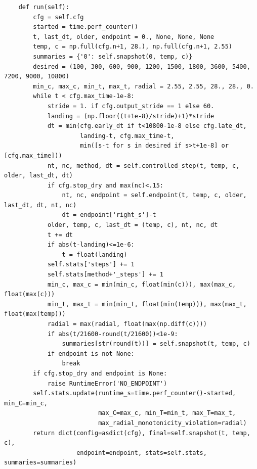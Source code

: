 \begin{verbatim}
    def run(self):
        cfg = self.cfg
        started = time.perf_counter()
        t, last_dt, older, endpoint = 0., None, None, None
        temp, c = np.full(cfg.n+1, 28.), np.full(cfg.n+1, 2.55)
        summaries = {'0': self.snapshot(0, temp, c)}
        desired = (100, 300, 600, 900, 1200, 1500, 1800, 3600, 5400, 7200, 9000, 10800)
        min_c, max_c, min_t, max_t, radial = 2.55, 2.55, 28., 28., 0.
        while t < cfg.max_time-1e-8:
            stride = 1. if cfg.output_stride == 1 else 60.
            landing = (np.floor((t+1e-8)/stride)+1)*stride
            dt = min(cfg.early_dt if t<10800-1e-8 else cfg.late_dt,
                     landing-t, cfg.max_time-t,
                     min([s-t for s in desired if s>t+1e-8] or [cfg.max_time]))
            nt, nc, method, dt = self.controlled_step(t, temp, c, older, last_dt, dt)
            if cfg.stop_dry and max(nc)<.15:
                nt, nc, endpoint = self.endpoint(t, temp, c, older, last_dt, dt, nt, nc)
                dt = endpoint['right_s']-t
            older, temp, c, last_dt = (temp, c), nt, nc, dt
            t += dt
            if abs(t-landing)<=1e-6:
                t = float(landing)
            self.stats['steps'] += 1
            self.stats[method+'_steps'] += 1
            min_c, max_c = min(min_c, float(min(c))), max(max_c, float(max(c)))
            min_t, max_t = min(min_t, float(min(temp))), max(max_t, float(max(temp)))
            radial = max(radial, float(max(np.diff(c))))
            if abs(t/21600-round(t/21600))<1e-9:
                summaries[str(round(t))] = self.snapshot(t, temp, c)
            if endpoint is not None:
                break
        if cfg.stop_dry and endpoint is None:
            raise RuntimeError('NO_ENDPOINT')
        self.stats.update(runtime_s=time.perf_counter()-started, min_C=min_c,
                          max_C=max_c, min_T=min_t, max_T=max_t,
                          max_radial_monotonicity_violation=radial)
        return dict(config=asdict(cfg), final=self.snapshot(t, temp, c),
                    endpoint=endpoint, stats=self.stats, summaries=summaries)

\end{verbatim}

